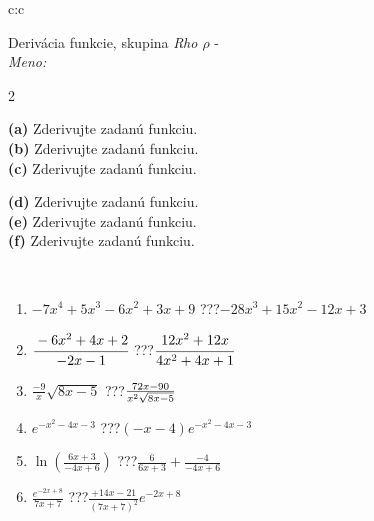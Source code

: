 \documentclass[10pt]{report}
\begin{document}
\newpage
\thispagestyle{empty}
\begin{tabular}{c:c}
\begin{minipage}[c][104.5mm][t]{0.5\linewidth}
\begin{center}
\vspace{7mm}
{\huge Derivácia funkcie, skupina \textit{Rho $\rho$} -}\\[5mm]
\textit{Meno:}\phantom{xxxxxxxxxxxxxxxxxxxxxxxxxxxxxxxxxxxxxxxxxxxxxxxxxxxxxxxxxxxxxxxxx}\\[5mm]
\begin{minipage}{0.95\linewidth}
\begin{center}
{\small \begin{multicols}{2} \raggedright
\textbf{(a)} Zderivujte zadanú funkciu. \\[1mm]
\textbf{(b)} Zderivujte zadanú funkciu. \\[1mm]
\textbf{(c)} Zderivujte zadanú funkciu. \par \columnbreak
\textbf{(d)} Zderivujte zadanú funkciu. \\[1mm]
\textbf{(e)} Zderivujte zadanú funkciu. \\[1mm]
\textbf{(f)} Zderivujte zadanú funkciu.
\end{multicols}
}
\end{center}
\end{minipage}
\\[4mm]
\begin{minipage}{0.79\linewidth}
\begin{center}
\begin{varwidth}{\linewidth}
\begin{enumerate}
\normalsize
\item $-7x^4+5x^3-6x^2+3x+9$\quad \dotfill\; ???\;\dotfill \quad $-28x^3+15x^2-12x+3$
\item $\cfrac{-6x^2+4x+2}{-2x-1}$\quad \dotfill\; ???\;\dotfill \quad $\cfrac{12x^2+12x}{4x^2+4x+1}$
\item $\frac{-9}{x}\sqrt{8x-5}$\quad \dotfill\; ???\;\dotfill \quad $\frac{72x-90}{x^2 \sqrt{\smash[b]{8x-5}}}$
\item $e^{-x^2-4x-3}$\quad \dotfill\; ???\;\dotfill \quad $(-x-4)e^{-x^2-4x-3}$
\item $\ln{\left(\frac{6x+3}{-4x+6}\right)}$\quad \dotfill\; ???\;\dotfill \quad $\frac{6}{6x+3}+\frac{-4}{-4x+6}$
\item $\frac{e^{-2x+8}}{7x+7}$\quad \dotfill\; ???\;\dotfill \quad $\frac{+14x-21}{(7x+7)^2}e^{-2x+8}$
\end{enumerate}

\end{varwidth}
\end{center}
\end{minipage}
\end{center}
\end{minipage}
\end{tabular}
\end{document}
